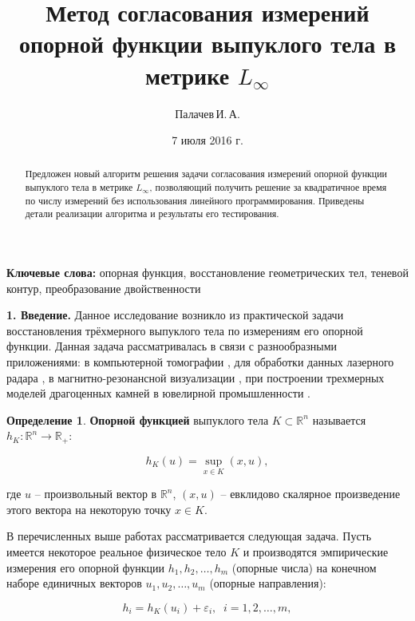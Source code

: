 \documentclass[a4paper, 10pt]{article}
\title{Метод согласования измерений опорной функции выпуклого тела в метрике
$L_{\infty}$}
\author{Палачев\,И.\,А.}
\date{7 июля 2016 г.}
\theoremstyle{definition}
\newtheorem{SmartDefinition}{Определение}
\theoremstyle{plain}
\theoremstyle{plain}
\begin{document}
\maketitle

\begin{abstract}
Предложен новый алгоритм решения задачи согласования измерений опорной функции
выпуклого тела в метрике $L_{\infty}$, позволяющий получить решение за
квадратичное время по числу измерений без использования линейного
программирования. Приведены детали реализации алгоритма и результаты его
тестирования.
\end{abstract}

\textbf{Ключевые слова:} опорная функция, восстановление геометрических тел,
теневой контур, преобразование двойственности

\textbf{1. Введение.}
Данное исследование возникло из практической задачи восстановления трёхмерного
выпуклого тела по измерениям его опорной функции. Данная задача рассматривалась
в связи с разнообразными приложениями: в компьютерной томографии
\cite{PrinceWillsky}, для обработки данных лазерного радара
\cite{LeleKulkarniWillsky}, в магнитно-резонансной визуализации
\cite{GregorRannou2001, GregorRannou2002}, при построении трехмерных моделей
драгоценных камней в ювелирной промышленности \cite{palachev}.

\begin{SmartDefinition}
 \label{def:support-function}
 \textbf{Опорной функцией} выпуклого тела $K \subset \mathbb{R}^{n}$
 называется
 $h_{K}: \mathbb{R}^{n} \to \mathbb{R}_{+}$:

 \begin{equation*}h_{K}(u) = \sup \limits_{x \in K}(x, u),\end{equation*}
\end{SmartDefinition}
где $u$ -- произвольный вектор в $\mathbb{R}^n$,
$(x, u)$ -- евклидово скалярное произведение этого вектора на некоторую точку
$x \in K$.

В перечисленных выше работах рассматривается следующая задача. Пусть
имеется некоторое реальное физическое тело $K$ и производятся эмпирические
измерения его опорной функции $h_{1}, h_{2}, \ldots, h_{m}$ (опорные числа) на
конечном наборе единичных векторов $u_{1}, u_{2}, \ldots, u_{m}$
(опорные направления):

\begin{equation*}
 h_{i} = h_{K}(u_{i}) + \varepsilon_{i}, \;\; i = 1, 2, \ldots, m,
\end{equation*}
\end{document}
